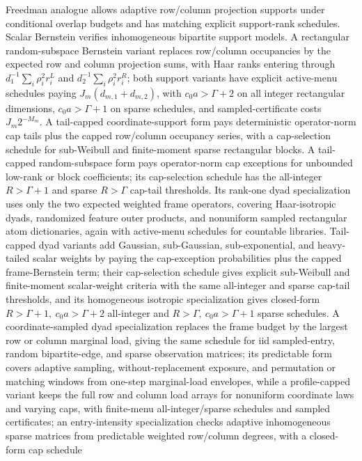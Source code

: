 \documentclass[11pt]{article}
\begin{document}
Freedman analogue allows adaptive row/column projection supports under
conditional overlap budgets and has matching explicit support-rank schedules.
Scalar Bernstein verifies inhomogeneous bipartite support models.  A
rectangular random-subspace Bernstein variant replaces row/column
occupancies by the expected row and column projection sums, with Haar ranks
entering through \(d_1^{-1}\sum_i\rho_i^2r_i^L\) and
\(d_2^{-1}\sum_i\rho_i^2r_i^R\); both support variants have explicit
active-menu schedules paying \(J_m(d_{m,1}+d_{m,2})\), with
\(c_0a>\Gamma+2\) on all integer rectangular dimensions,
\(c_0a>\Gamma+1\) on sparse schedules, and sampled-certificate costs
\(J_m2^{-M_m}\).  A tail-capped coordinate-support form pays deterministic
operator-norm cap tails plus the capped row/column occupancy series, with a
cap-selection schedule for sub-Weibull and finite-moment sparse rectangular
blocks.  A tail-capped random-subspace form pays operator-norm cap exceptions
for unbounded low-rank or block coefficients; its cap-selection schedule has
the all-integer \(R>\Gamma+1\) and sparse \(R>\Gamma\) cap-tail thresholds.
Its rank-one dyad
specialization uses only the two expected
weighted frame operators, covering Haar-isotropic dyads, randomized feature
outer products, and nonuniform sampled rectangular atom dictionaries, again with
active-menu schedules for countable libraries.  Tail-capped dyad variants add
Gaussian, sub-Gaussian, sub-exponential, and heavy-tailed scalar weights by
paying the cap-exception probabilities plus the capped frame-Bernstein term;
their cap-selection schedule gives explicit sub-Weibull and finite-moment
scalar-weight criteria with the same all-integer and sparse cap-tail thresholds,
and its homogeneous isotropic specialization gives closed-form
\(R>\Gamma+1,\ c_0a>\Gamma+2\) all-integer and
\(R>\Gamma,\ c_0a>\Gamma+1\) sparse schedules.  A coordinate-sampled dyad
specialization replaces the frame budget by the largest row or column marginal
load, giving the same schedule for iid sampled-entry, random bipartite-edge,
and sparse observation matrices; its predictable form covers adaptive sampling,
without-replacement exposure, and permutation or matching windows from
one-step marginal-load envelopes, while a profile-capped variant keeps the full
row and column load arrays for nonuniform coordinate laws and varying caps,
with finite-menu all-integer/sparse schedules and sampled certificates; an
entry-intensity specialization checks adaptive inhomogeneous sparse matrices
from predictable weighted row/column degrees, with a closed-form cap schedule
\end{document}
